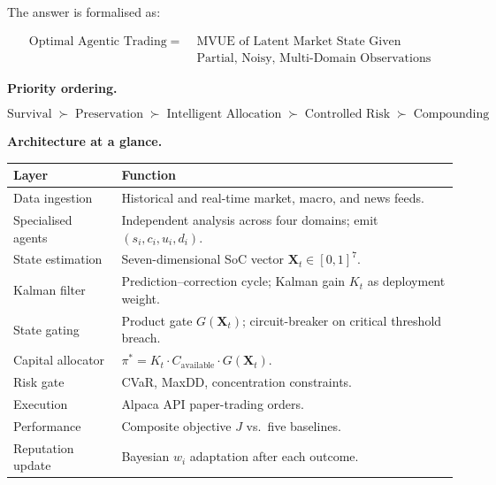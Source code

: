\documentclass[12pt,openany]{book}
\numberwithin{equation}{chapter}
\theoremstyle{plain}
\theoremstyle{definition}
\theoremstyle{remark}
\renewcommand{\arraystretch}{1.2}
\begin{document}
\noindent
The answer is formalised as:

\begin{equation}
  \begin{aligned}
    \text{Optimal Agentic Trading}
    \;=\;\;&\text{MVUE of Latent Market State Given}\\
    &\text{Partial, Noisy, Multi-Domain Observations}
  \end{aligned}
\end{equation}

\noindent\textbf{Priority ordering.}

\begin{equation}
  \text{Survival}
  \;\succ\; \text{Preservation}
  \;\succ\; \text{Intelligent Allocation}
  \;\succ\; \text{Controlled Risk}
  \;\succ\; \text{Compounding}
\end{equation}

\noindent\textbf{Architecture at a glance.}

\begin{center}
\renewcommand{\arraystretch}{1.35}
\begin{tabularx}{\textwidth}{@{} l X @{}}
\toprule
\textbf{Layer} & \textbf{Function} \\
\midrule
Data ingestion & Historical and real-time market, macro, and news feeds. \\
Specialised agents & Independent analysis across four domains; emit $(s_i, c_i, u_i, d_i)$. \\
State estimation & Seven-dimensional SoC vector $\mathbf{X}_t \in [0,1]^7$. \\
Kalman filter & Prediction--correction cycle; Kalman gain $K_t$ as deployment weight. \\
State gating & Product gate $G(\mathbf{X}_t)$; circuit-breaker on critical threshold breach. \\
Capital allocator & $\pi^* = K_t \cdot C_{\mathrm{available}} \cdot G(\mathbf{X}_t)$. \\
Risk gate & CVaR, MaxDD, concentration constraints. \\
Execution & Alpaca API paper-trading orders. \\
Performance & Composite objective $J$ vs.\ five baselines. \\
Reputation update & Bayesian $w_i$ adaptation after each outcome. \\
\bottomrule
\end{tabularx}
\end{center}

\end{document}
